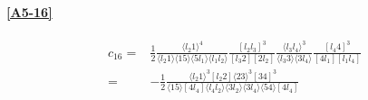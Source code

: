 \paragraph{\ref{A5-16}}
\begin{equation*}
\begin{split}
c_{16} = & \frac{1}{2}
\frac{\langle l_2 1 \rangle^4}{\langle l_2 1 \rangle\langle 15 \rangle\langle 5 l_1 \rangle\langle l_1 l_2\rangle}
\frac{[l_2 l_3]^3}{[l_3 2 ][2 l_2]}
\frac{\langle l_3 l_4\rangle^3}{\langle l_3 3\rangle\langle 3 l_4\rangle}
\frac{[l_4 4 ]^3}{[4l_1][l_1l_4]}
\\
= & 
-\frac{1}{2}\frac{\langle l_2 1\rangle^3[l_2 2 ]\langle 23 \rangle^3[34]^3}{\langle 15 \rangle[4l_4]\langle l_4 l_2\rangle\langle 3l_2\rangle \langle 3 l_4\rangle\langle 54\rangle[4l_4]}
\end{split}
\end{equation*}



















